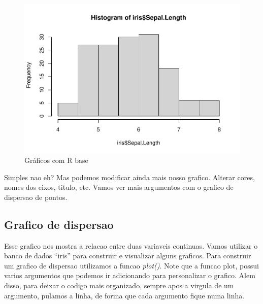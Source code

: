 \documentclass[
]{book}
\newenvironment{Shaded}{\begin{snugshade}}{\end{snugshade}}
\newcommand{\CommentTok}[1]{\textcolor[rgb]{0.56,0.35,0.01}{\textit{#1}}}
\newcommand{\FunctionTok}[1]{\textcolor[rgb]{0.13,0.29,0.53}{\textbf{#1}}}
\newcommand{\NormalTok}[1]{#1}
\newcommand{\SpecialCharTok}[1]{\textcolor[rgb]{0.81,0.36,0.00}{\textbf{#1}}}
\begin{document}
\begin{Shaded}
\end{Shaded}

\begin{figure}
\centering
\includegraphics{_main_files/figure-latex/nome-do-chunk1-1.pdf}
\caption{\label{fig:nome-do-chunk1}Gráficos com R base}
\end{figure}

Simples nao eh? Mas podemos modificar ainda mais nosso grafico. Alterar cores, nomes dos eixos, titulo, etc. Vamos ver mais argumentos com o grafico de dispersao de pontos.

\hypertarget{grafico-de-dispersao}{%
\subsection{Grafico de dispersao}\label{grafico-de-dispersao}}

Esse grafico nos mostra a relacao entre duas variaveis continuas. Vamos utilizar o banco de dados ``iris'' para construir e visualizar alguns graficos. Para construir um grafico de dispersao utilizamos a funcao \emph{plot()}. Note que a funcao plot, possui varios argumentos que podemos ir adicionando para personalizar o grafico. Alem disso, para deixar o codigo mais organizado, sempre apos a virgula de um argumento, pulamos a linha, de forma que cada argumento fique numa linha.
\end{document}

